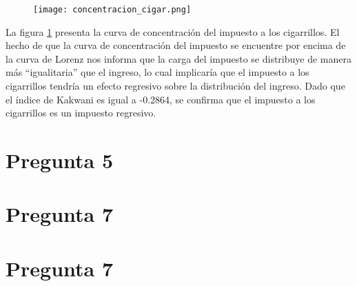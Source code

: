 \documentclass[11pt,oneside]{article}
\begin{document}
	\begin{figure}
    		\centering
    		\texttt{[image: concentracion\_cigar.png]}
    		\label{fig:4B}
	\end{figure}

	La figura \ref{fig:4B} presenta la curva de concentración del impuesto a los cigarrillos. El hecho de que la curva de concentración del impuesto se encuentre por encima de la curva de Lorenz nos informa que la carga del impuesto se distribuye de manera más ``igualitaria'' que el ingreso, lo cual implicaría que el impuesto a los cigarrillos tendría un efecto regresivo sobre la distribución del ingreso. Dado que el índice de Kakwani es igual a -0.2864, se confirma que el impuesto a los cigarrillos es un impuesto regresivo.
 
	\section*{Pregunta 5}
	\section*{Pregunta 7}
	\section*{Pregunta 7}
	
	
	
	
	
	
	
\end{document}
